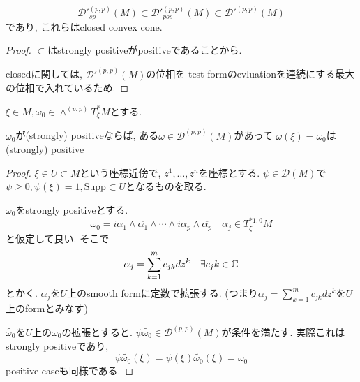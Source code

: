 \begin{tcolorbox}[mybox]
\begin{lem}
\label{lem-M-7.4.3}
$$
{\mathcal{D}'}^{(p,p)}_{sp}(M) 
\subset 
{\mathcal{D}'}^{(p,p)}_{pos}(M)
\subset 
{\mathcal{D}'}^{(p,p)}(M)
$$
であり, これらはclosed convex cone.
\end{lem}
\end{tcolorbox}
\begin{proof}
$\subset$はstrongly positiveがpositiveであることから.

closedに関しては, ${\mathcal{D}'}^{(p,p)}(M)$の位相を
test formのevluationを連続にする最大の位相で入れているため.
\end{proof}

\begin{tcolorbox}[mybox]
\begin{lem}
\label{lem-M-7.4.4}
$\xi \in M, \omega_0 \in \wedge^{(p,p)}T^{*}_{\xi}M$とする. 

$\omega_0$が(strongly) positiveならば, ある$\omega \in {\mathcal{D}}^{(p,p)}(M)$があって
$\omega(\xi)=\omega_0$は(strongly) positive
\end{lem}
\end{tcolorbox}
\begin{proof}
$\xi \in U \subset M$という座標近傍で, $z^1, \ldots, z^n$を座標とする. 
$\psi \in {\mathcal{D}}(M)$で$\psi \ge 0, \psi(\xi)=1, \mathrm{Supp} \subset U$となるものを取る. 

$\omega_0$をstrongly positiveとする.
$$
\omega_0
=
i\alpha_1\wedge\overline{\alpha_1}\wedge\cdots\wedge
i\alpha_p\wedge\overline{\alpha_p}
\quad
\alpha_j \in T^{* 1,0}_\xi M
$$
と仮定して良い. 
そこで
$$
\alpha_j = \sum_{k=1}^{m}c_{jk}dz^k
\quad \exists c_jk \in \mathbb{C}
$$
とかく. $\alpha_j$を$U$上のsmooth formに定数で拡張する. 
(つまり$\alpha_j = \sum_{k=1}^{m}c_{jk}dz^k$を$U$上のformとみなす)

$\widetilde{\omega_0}$を$U$上の$\omega_0$の拡張とすると. 
$\psi \widetilde{\omega_0} \in {\mathcal{D}}^{(p,p)}(M) $が条件を満たす.
実際これはstrongly positiveであり, 
$$
\psi \widetilde{\omega_0}(\xi)
=\psi(\xi)\widetilde{\omega_0}(\xi)
=\omega_0
$$
positive caseも同様である. 
\end{proof}


